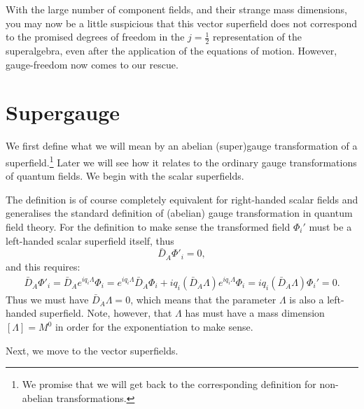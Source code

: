 \documentclass[notes.tex]{subfiles}
\begin{document}
With the large number of component fields, and their strange mass dimensions, you may now be a little suspicious that this vector superfield does not correspond to the promised degrees of freedom in the $j=\frac{1}{2}$ representation of the superalgebra, even after the application of the equations of motion. However, gauge-freedom now comes to our rescue.



\section{Supergauge}
We first define what we will mean by an abelian (super)gauge transformation of a superfield.\footnote{We promise that we will get back to the corresponding definition for non-abelian transformations.} Later we will see how it relates to the ordinary gauge transformations of quantum fields. We begin with the scalar superfields.

The definition is of course completely equivalent for right-handed scalar fields and generalises the standard definition of (abelian) gauge transformation in quantum field theory.
For the definition to make sense the transformed field $\Phi_i'$ must be a left-handed scalar superfield itself, thus
\[\bar{D}_{\dot{A}}\Phi'_i = 0,\]
and this requires:
\begin{eqnarray*}
\bar{D}_{\dot{A}}\Phi'_i = \bar{D}_{\dot{A}}e^{iq_i\Lambda }\Phi_i =  e^{iq_i\Lambda }\bar{D}_{\dot{A}}\Phi_i +iq_i(\bar{D}_{\dot{A}}\Lambda)e^{i q_i\Lambda}\Phi_i
= iq_i(\bar{D}_{\dot{A}}\Lambda)\Phi_i'=0.
\end{eqnarray*}
Thus we must have $\bar{D}_{\dot{A}}\Lambda = 0$, which means that  the parameter $\Lambda$ is also a left-handed superfield. Note, however, that $\Lambda$ has must have a mass dimension $[\Lambda]=M^0$ in order for the exponentiation to make sense.

Next, we move to the vector superfields.
\end{document}
